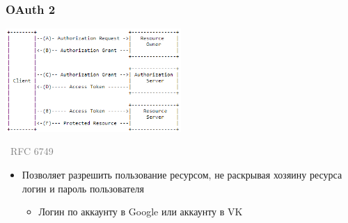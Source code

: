 \documentclass[xetex,mathserif,serif]{beamer}
\newcommand{\attribution}[1] {
\vspace{-5mm}\begin{flushright}\begin{scriptsize}\textcolor{gray}{\textcopyright\, #1}\end{scriptsize}\end{flushright}
}
\begin{document}
    \begin{frame}
        \frametitle{OAuth 2}
        \begin{center}
            \includegraphics[width=0.5\textwidth]{oauth.png}
            \attribution{RFC 6749}
        \end{center}
        \begin{itemize}
            \item Позволяет разрешить пользование ресурсом, не раскрывая хозяину ресурса логин и пароль пользователя
            \begin{itemize}
                \item Логин по аккаунту в Google или аккаунту в VK
            \end{itemize}
        \end{itemize}
    \end{frame}
\end{document}
